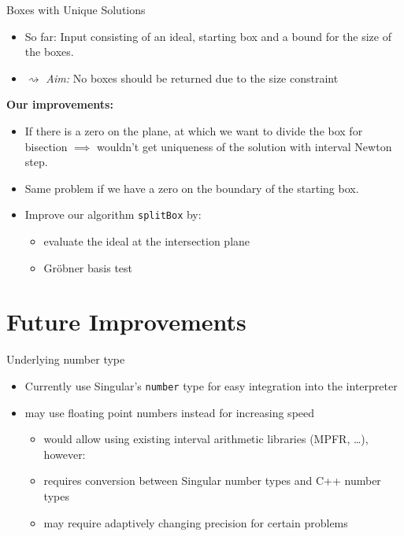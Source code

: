 \documentclass[german,10pt,xcolor=colortbl,compress]{beamer}
\begin{document}
\begin{frame}{Boxes with Unique Solutions}
    \begin {itemize}
        \item So far: Input consisting of an ideal, starting box and a bound for the size
            of the boxes.
        \item[]$\rightsquigarrow$ \emph{Aim:} No boxes should be returned due to the size
            constraint
    \end{itemize}
    \pause
    \textbf{Our improvements:}
    \begin{itemize}
        \item If there is a zero on the plane, at which we want to divide the box for
            bisection $\implies$ wouldn't get uniqueness of the solution with interval
            Newton step.
        \item Same problem if we have a zero on the boundary of the starting box.
        \item Improve our algorithm \texttt{splitBox} by:
        \begin{itemize}
            \item evaluate the ideal at the intersection plane
            \item Gröbner basis test
        \end{itemize}
    \end{itemize}
\end{frame}

\section{Future Improvements}

\begin{frame}{Underlying number type}
    \begin{itemize}
        \item Currently use Singular's \texttt{number} type for easy integration into the
            interpreter
        \item may use floating point numbers instead for increasing speed
            \begin{itemize}
                \item would allow using existing interval arithmetic libraries (MPFR,
                    \dots), however:
                \item requires conversion between Singular number types and C++ number
                    types
                \item may require adaptively changing precision for certain problems
            \end{itemize}
    \end{itemize}
\end{frame}
\end{document}
